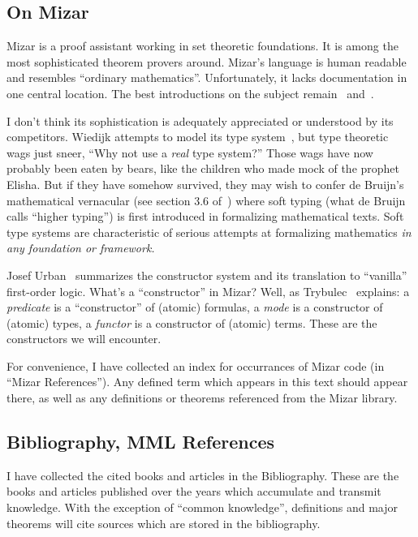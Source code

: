 \subsection*{On Mizar}
Mizar is a proof assistant working in set theoretic foundations. It is
among the most sophisticated theorem provers around. Mizar's language is
human readable and resembles ``ordinary mathematics''. Unfortunately, it
lacks documentation in one central location. The best introductions on
the subject remain~\cite{grabowski2010mizar}
and~\cite{wiedijk2006mizman}.

I don't think its sophistication is adequately appreciated or understood
by its competitors. Wiedijk attempts to model its type
system~\cite{wiedijk2007mizar}, but type theoretic wags just sneer,
``Why not use a \emph{real} type system?'' Those wags have now probably been eaten
by bears, like the children who made mock of the prophet Elisha. But if
they have somehow survived, they may wish to confer de Bruijn's mathematical
vernacular (see section {3.6} of~\cite{de1994mathematical}) where soft
typing (what de Bruijn calls ``higher typing'') is first introduced in
formalizing mathematical texts. Soft type systems are characteristic of
serious attempts at formalizing mathematics \emph{in any foundation or framework.}

Josef Urban~\cite{urban2003translating} summarizes the constructor
system and its translation to ``vanilla'' first-order logic. What's a
``constructor'' in Mizar? Well, as Trybulec~\cite{trybulec1993some}
explains: a \emph{predicate} is a ``constructor'' of (atomic) formulas,
a \emph{mode} is a constructor of (atomic) types, a \emph{functor} is a
constructor of (atomic) terms. These are the constructors we will
encounter.

For convenience, I have collected an index for occurrances of Mizar code
(in ``Mizar References''). Any defined term which appears in this text
should appear there, as well as any definitions or theorems referenced
from the Mizar library.

\subsection*{Bibliography, MML References}
I have collected the cited books and articles in the Bibliography. These
are the books and articles published over the years which accumulate and
transmit knowledge. With the exception of ``common knowledge'',
definitions and major theorems will cite sources which are stored in the
bibliography.


